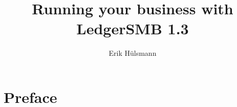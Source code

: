 \documentclass[10pt,A4]{book}
\begin{document}
\author{Erik H\"ulsmann}
\title{Running your business with LedgerSMB 1.3}


\maketitle


\tableofcontents



\chapter*{Preface}








\end{document}

